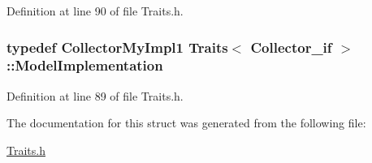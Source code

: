 Definition at line 90 of file Traits.\-h.

\hypertarget{struct_traits_3_01_collector__if_01_4_a38ef8e0ef3488a361965174720a895ae}{
\subsubsection[{Model\-Implementation}]{\setlength{\rightskip}{0pt plus 5cm}typedef {\bf Collector\-My\-Impl1} {\bf Traits}$<$ {\bf Collector\-\_\-if} $>$\-::{\bf Model\-Implementation}}}\label{struct_traits_3_01_collector__if_01_4_a38ef8e0ef3488a361965174720a895ae}


Definition at line 89 of file Traits.\-h.



The documentation for this struct was generated from the following file\-:\begin{DoxyCompactItemize}
\item 
\hyperlink{_traits_8h}{Traits.\-h}\end{DoxyCompactItemize}
